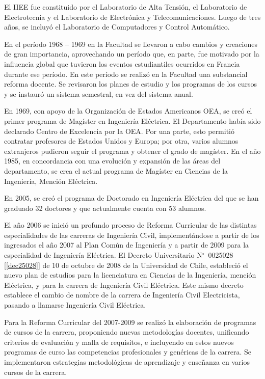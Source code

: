El IIEE fue constituido por el Laboratorio de Alta Tensión, el Laboratorio de Electrotecnia y
el Laboratorio de Electrónica y Telecomunicaciones. Luego de tres años, se incluyó el Laboratorio
de Computadores y Control Automático.

En el período 1968 – 1969 en la Facultad se llevaron a cabo cambios y creaciones de gran
importancia, aprovechando un período que, en parte, fue motivado por la influencia global que
tuvieron los eventos estudiantiles ocurridos en Francia durante ese período. En este período se
realizó en la Facultad una substancial reforma docente. Se revisaron los planes de estudio y los
programas de los cursos y se instauró un sistema semestral, en vez del sistema anual.

En 1969, con apoyo de la Organización de Estados Americanos OEA, se creó el primer
programa de Magíster en Ingeniería Eléctrica. El Departamento había sido declarado Centro de
Excelencia por la OEA. Por una parte, esto permitió contratar profesores de Estados Unidos y
Europa; por otra, varios alumnos extranjeros pudieron seguir el programa y obtener el grado
de magíster. En el año 1985, en concordancia con una evolución y expansión de las áreas del
departamento, se crea el actual programa de Magíster en Ciencias de la Ingeniería, Mención
Eléctrica.

En 2005, se creó el programa de Doctorado en Ingeniería Eléctrica del que se han graduado
32 doctores y que actualmente cuenta con 53 alumnos.

El año 2006 se inició un profundo proceso de Reforma Curricular de las distintas
especialidades de las carreras de Ingeniería Civil, implementándose a partir de los ingresados el año
2007 al Plan Común de Ingeniería y a partir de 2009 para la especialidad de Ingeniería Eléctrica.
El Decreto Universitario N$^\circ$~0025028 [\ref{dec25028}] de 10 de octubre de 2008 de la Universidad de Chile,
estableció el nuevo plan de estudios para la licenciatura en Ciencias de la Ingeniería, mención
Eléctrica, y para la carrera de Ingeniería Civil Eléctrica. Este mismo decreto establece el cambio
de nombre de la carrera de Ingeniería Civil Electricista, pasando a llamarse Ingeniería Civil
Eléctrica.

Para la Reforma Curricular del 2007-2009 se realizó la elaboración de programas de cursos de
la carrera, proponiendo nuevas metodologías docentes, unificando criterios de evaluación y malla
de requisitos, e incluyendo en estos nuevos programas de curso las competencias profesionales y
genéricas de la carrera. Se implementaron estrategias metodológicas de aprendizaje y enseñanza
en varios cursos de la carrera.

